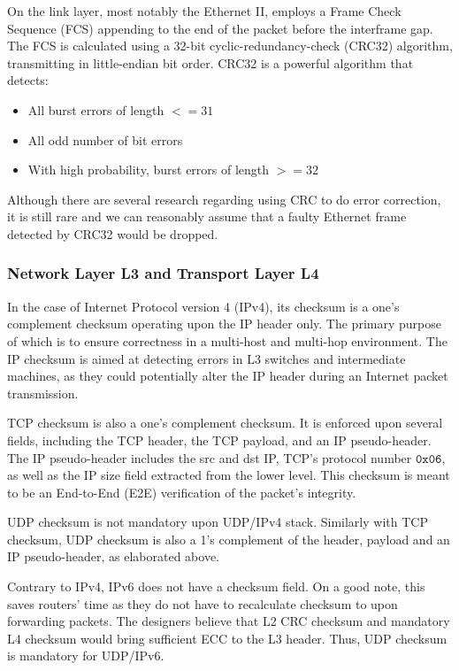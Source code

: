 \documentclass[12pt]{article}
\begin{document}
On the link layer, most notably the Ethernet II, employs a Frame Check Sequence (FCS) appending to the end of the packet before the interframe gap. The FCS is calculated using a 32-bit cyclic-redundancy-check (CRC32) algorithm, transmitting in little-endian bit order. CRC32 is a powerful algorithm that detects:
\begin{itemize}
    \item All burst errors of length $<= 31$
    \item All odd number of bit errors
    \item With high probability, burst errors of length $>= 32$
\end{itemize}

Although there are several research regarding using CRC to do error correction, it is still rare and we can reasonably assume that a faulty Ethernet frame detected by CRC32 would be dropped.

\subsubsection{Network Layer L3 and Transport Layer L4}

In the case of Internet Protocol version 4 (IPv4), its checksum is a one's complement checksum operating upon the IP header only. The primary purpose of which is to ensure correctness in a multi-host and multi-hop environment. The IP checksum is aimed at detecting errors in L3 switches and intermediate machines, as they could potentially alter the IP header during an Internet packet transmission.

TCP checksum is also a one's complement checksum. It is enforced upon several fields, including the TCP header, the TCP payload, and an IP pseudo-header. The IP pseudo-header includes the src and dst IP, TCP's protocol number $\mathtt{0x06}$, as well as the IP size field extracted from the lower level. This checksum is meant to be an End-to-End (E2E) verification of the packet's integrity.

UDP checksum is not mandatory upon UDP/IPv4 stack. Similarly with TCP checksum, UDP checksum is also a 1's complement of the header, payload and an IP pseudo-header, as elaborated above.

Contrary to IPv4, IPv6 does not have a checksum field. On a good note, this saves routers' time as they do not have to recalculate checksum to upon forwarding packets. The designers believe that L2 CRC checksum and mandatory L4 checksum would bring sufficient ECC to the L3 header. Thus, UDP checksum is mandatory for UDP/IPv6.
\end{document}
